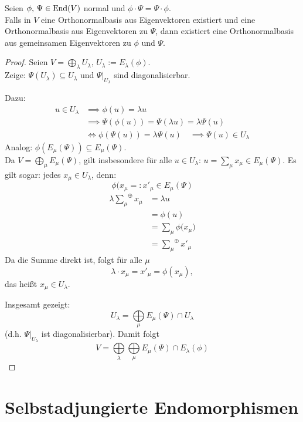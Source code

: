 \documentclass[parskip,a4paper,twoside,DIV15,BCOR12mm]{scrbook}
\begin{document}
\begin{theo}
\label{Satz 18.2}
Seien \(\phi,\,\Psi\in\operatorname{End}(V)\) normal und \(\phi\cdot\Psi=\Psi\cdot\phi\).\\
Falls in \(V\) eine Orthonormalbasis aus Eigenvektoren existiert und eine
Orthonormalbasis aus Eigenvektoren zu \(\Psi\), dann existiert eine
Orthonormalbasis aus gemeinsamen Eigenvektoren zu \(\phi\) und \(\Psi\).
\end{theo}
\begin{proof}
Seien \(V=\underset{\lambda}{\bigoplus}U_{\lambda},\,U_{\lambda}:=E_{\lambda}(\phi)\).\\
Zeige: \(\Psi(U_{\lambda})\subseteq U_{\lambda}\) und \(\left.\Psi\right|_{U_{\lambda}}\) sind diagonalisierbar.

Dazu:
\begin{align*}
u\in U_{\lambda}&\implies\phi(u)=\lambda u\\
&\implies\Psi(\phi(u))=\Psi(\lambda u)=\lambda\Psi(u)\\
&\Longleftrightarrow\phi(\Psi(u))=\lambda\Psi(u)\quad\implies\Psi(u)\in U_{\lambda}
\end{align*}
Analog: \(\phi(E_{\mu}(\Psi))\subseteq E_{\mu}(\Psi)\).\\
Da \(V=\underset{\mu}{\bigoplus}E_{\mu}(\Psi)\), gilt insbesondere für alle
\(u\in U_{\lambda}:\,u=\sum_{\mu}{x_{\mu}}\in E_{\mu}(\Psi)\). Es gilt sogar:
jedes \(x_{\mu}\in U_{\lambda}\), denn:
\[
\phi(x_{\mu}=:x'_{\mu}\in E_{\mu}(\Psi)
\]
\begin{align*}
\lambda{\sum_{\mu}}^{\oplus}x_{\mu}&=\lambda u\\
&=\phi(u)\\
&=\sum_{\mu}{\phi(x_{\mu}})\\
&={\sum_{\mu}}^{\oplus}{x'_{\mu}}
\end{align*}
Da die Summe direkt ist, folgt für alle \(\mu\)
\[
\lambda\cdot x_{\mu}=x'_{\mu}=\phi(x_{\mu}),
\]
das heißt \(x_{\mu}\in U_{\lambda}\).

Insgesamt gezeigt:
\[
U_{\lambda}=\underset{\mu}{\bigoplus}E_{\mu}(\Psi)\cap U_{\lambda}
\]
(d.h. \(\left.\Psi\right|_{U_{\lambda}}\) ist diagonalisierbar). Damit folgt
\[
V=\underset{\lambda}{\bigoplus}\underset{\mu}{\bigoplus}E_{\mu}(\Psi)\cap E_{\lambda}(\phi)
\]
\end{proof}

\section{Selbstadjungierte Endomorphismen}
\end{document}
